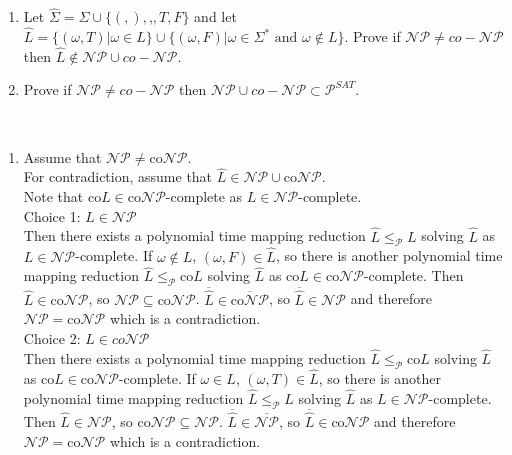 \documentclass{assignment}
\begin{document}
\begin{problemlist}
\begin{answer}
\begin{enumerate}
\end{enumerate}
\end{answer}
\clearpage
\pbitem
\begin{problem}
  \begin{enumerate}
  \item Let $\hat{\Sigma}=\Sigma \cup \{(,),\textbf{,},T,F\}$ and let $\hat{L}=\{(\omega, T) | \omega \in L\}\cup\{(\omega,F)|\omega \in \Sigma^* \text{ and } \omega \notin L\}$. Prove if $\mathcal{NP} \neq co-\mathcal{NP}$ then $\hat{L} \notin \mathcal{NP}\cup co-\mathcal{NP}$.
    \item Prove if $\mathcal{NP} \neq co-\mathcal{NP}$ then $\mathcal{NP}\cup co-\mathcal{NP} \subset \mathcal{P}^{SAT}$.
  \end{enumerate}
\end{problem}
\begin{answer}
\\
\begin{enumerate}
\item Assume that $\mathcal{NP} \neq \text{co}\mathcal{NP}$.\\
For contradiction, assume that $\hat{L} \in \mathcal{NP}\cup \text{co}\mathcal{NP}$.\\
Note that co$L \in \text{co}\mathcal{NP}$-complete as $L \in \mathcal{NP}$-complete.\\
Choice 1: $\hat{L} \in \mathcal{NP}$\\
Then there exists a polynomial time mapping reduction $\hat{L} \le_{\mathcal{P}} L$ solving $\hat{L}$ as $L\in \mathcal{NP}$-complete. If $\omega \notin L$, $(\omega,F)\in \hat{L}$, so there is another polynomial time mapping reduction $\hat{L} \le_{\mathcal{P}} \text{co}L$ solving $\hat{L}$ as co$L \in \text{co}\mathcal{NP}$-complete. Then $\hat{L} \in \text{co}\mathcal{NP}$, so $\mathcal{NP} \subseteq \text{co}\mathcal{NP}$. $\overline{\hat{L}} \in \overline{\text{co}\mathcal{NP}}$, so $\overline{\hat{L}} \in \mathcal{NP}$ and therefore $\mathcal{NP} = \text{co}\mathcal{NP}$ which is a contradiction.\\
Choice 2: $\hat{L} \in co\mathcal{NP}$\\
Then there exists a polynomial time mapping reduction $\hat{L} \le_{\mathcal{P}} \text{co}L$ solving $\hat{L}$ as co$L\in \text{co}\mathcal{NP}$-complete. If $\omega \in L$, $(\omega,T)\in \hat{L}$, so there is another polynomial time mapping reduction $\hat{L} \le_{\mathcal{P}} L$ solving $\hat{L}$ as $L \in \mathcal{NP}$-complete. Then $\hat{L} \in \mathcal{NP}$, so co$\mathcal{NP} \subseteq \mathcal{NP}$. $\overline{\hat{L}} \in \overline{\mathcal{NP}}$, so $\overline{\hat{L}} \in \text{co}\mathcal{NP}$ and therefore $\mathcal{NP} = \text{co}\mathcal{NP}$ which is a contradiction.\\

\end{enumerate}
\end{answer}
\end{problemlist}
\end{document}
